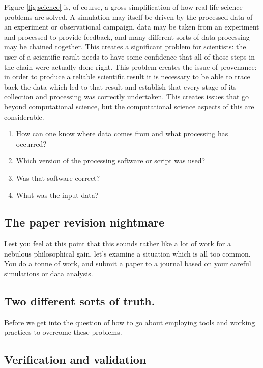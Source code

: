 \documentclass[a4paper,12pt]{article}
\theoremstyle{definition}
\begin{document}
Figure \ref{fig:science} is, of course, a gross simplification of how real
life science problems are solved. A simulation may itself be driven by the
processed data of an experiment or observational campaign, data may be taken
from an experiment and processed to provide feedback, and many different
sorts of data processing may be chained together. This creates a significant
problem for scientists: the user of a scientific result needs to have some
confidence that all of those steps in the chain were actually done
right. This problem creates the issue of provenance: in order to produce a
reliable scientific result it is necessary to be able to trace back the data
which led to that result and establish that every stage of its collection
and processing was correctly undertaken. This creates issues that go beyond
computational science, but the computational science aspects of this are
considerable.
\begin{enumerate}
\item How can one know where data comes from and what processing has
  occurred?
\item Which version of the processing software or script was used?
\item Was that software correct?
\item What was the input data?
\end{enumerate}

\subsection{The paper revision nightmare}

Lest you feel at this point that this sounds rather like a lot of work for a
nebulous philosophical gain, let's examine a situation which is all too
common. You do a tonne of work, and submit a paper to a journal based on
your careful simulations or data analysis. 

\subsection{Two different sorts of truth.}

Before we get into the question of how to go about employing tools and
working practices to overcome these problems.


\subsection{Verification and validation}
\end{document}
